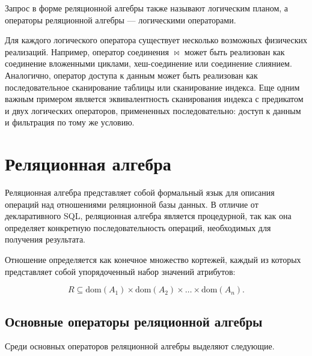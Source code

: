 \documentclass[fontsize=14pt, russian]{scrartcl}
\begin{document}
Запрос в форме реляционной алгебры также называют логическим планом, а операторы
реляционной алгебры --- логическими операторами.

Для каждого логического оператора существует несколько возможных физических
реализаций. Например, оператор соединения \(\bowtie\) может быть реализован как
соединение вложенными циклами, хеш-соединение или соединение слиянием.
Аналогично, оператор доступа к данным может быть реализован как последовательное
сканирование таблицы или сканирование индекса. Еще одним важным примером
является эквивалентность сканирования индекса с предикатом и двух логических
операторов, примененных последовательно: доступ к данным и фильтрация по тому же
условию.

\section{Реляционная алгебра}

Реляционная алгебра представляет собой формальный язык для описания операций над
отношениями реляционной базы данных. В отличие от декларативного SQL,
реляционная алгебра является процедурной, так как она определяет конкретную
последовательность операций, необходимых для получения результата.

Отношение определяется как конечное множество кортежей, каждый из которых
представляет собой упорядоченный набор значений атрибутов:

\[
  R \subseteq \text{dom}(A_1) \times \text{dom}(A_2) \times \ldots \times \text{dom}(A_n).
\]

\subsection{Основные операторы реляционной алгебры}

Среди основных операторов реляционной алгебры выделяют следующие.
\end{document}
